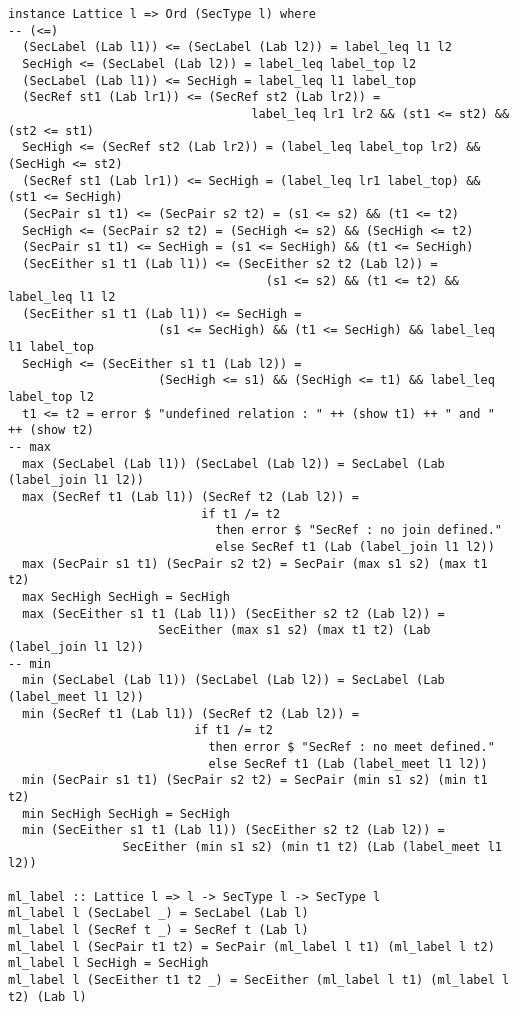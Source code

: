 \begin{Verbatim}[fontsize=\footnotesize,frame=lines,
                 framesep=5mm, label={[Lattice.hs]Lattice.hs}]
instance Lattice l => Ord (SecType l) where
-- (<=)
  (SecLabel (Lab l1)) <= (SecLabel (Lab l2)) = label_leq l1 l2
  SecHigh <= (SecLabel (Lab l2)) = label_leq label_top l2
  (SecLabel (Lab l1)) <= SecHigh = label_leq l1 label_top
  (SecRef st1 (Lab lr1)) <= (SecRef st2 (Lab lr2)) = 
                                  label_leq lr1 lr2 && (st1 <= st2) && (st2 <= st1)
  SecHigh <= (SecRef st2 (Lab lr2)) = (label_leq label_top lr2) && (SecHigh <= st2)
  (SecRef st1 (Lab lr1)) <= SecHigh = (label_leq lr1 label_top) && (st1 <= SecHigh)
  (SecPair s1 t1) <= (SecPair s2 t2) = (s1 <= s2) && (t1 <= t2)
  SecHigh <= (SecPair s2 t2) = (SecHigh <= s2) && (SecHigh <= t2)
  (SecPair s1 t1) <= SecHigh = (s1 <= SecHigh) && (t1 <= SecHigh)
  (SecEither s1 t1 (Lab l1)) <= (SecEither s2 t2 (Lab l2)) = 
                                    (s1 <= s2) && (t1 <= t2) && label_leq l1 l2
  (SecEither s1 t1 (Lab l1)) <= SecHigh = 
                     (s1 <= SecHigh) && (t1 <= SecHigh) && label_leq l1 label_top
  SecHigh <= (SecEither s1 t1 (Lab l2)) = 
                     (SecHigh <= s1) && (SecHigh <= t1) && label_leq label_top l2
  t1 <= t2 = error $ "undefined relation : " ++ (show t1) ++ " and " ++ (show t2) 
-- max
  max (SecLabel (Lab l1)) (SecLabel (Lab l2)) = SecLabel (Lab (label_join l1 l2))
  max (SecRef t1 (Lab l1)) (SecRef t2 (Lab l2)) = 
                           if t1 /= t2
                             then error $ "SecRef : no join defined."
                             else SecRef t1 (Lab (label_join l1 l2))
  max (SecPair s1 t1) (SecPair s2 t2) = SecPair (max s1 s2) (max t1 t2)
  max SecHigh SecHigh = SecHigh
  max (SecEither s1 t1 (Lab l1)) (SecEither s2 t2 (Lab l2)) = 
                     SecEither (max s1 s2) (max t1 t2) (Lab (label_join l1 l2))
-- min
  min (SecLabel (Lab l1)) (SecLabel (Lab l2)) = SecLabel (Lab (label_meet l1 l2))
  min (SecRef t1 (Lab l1)) (SecRef t2 (Lab l2)) = 
                          if t1 /= t2
                            then error $ "SecRef : no meet defined."
                            else SecRef t1 (Lab (label_meet l1 l2))
  min (SecPair s1 t1) (SecPair s2 t2) = SecPair (min s1 s2) (min t1 t2)
  min SecHigh SecHigh = SecHigh
  min (SecEither s1 t1 (Lab l1)) (SecEither s2 t2 (Lab l2)) =
                SecEither (min s1 s2) (min t1 t2) (Lab (label_meet l1 l2))

ml_label :: Lattice l => l -> SecType l -> SecType l
ml_label l (SecLabel _) = SecLabel (Lab l)
ml_label l (SecRef t _) = SecRef t (Lab l)
ml_label l (SecPair t1 t2) = SecPair (ml_label l t1) (ml_label l t2)
ml_label l SecHigh = SecHigh
ml_label l (SecEither t1 t2 _) = SecEither (ml_label l t1) (ml_label l t2) (Lab l)


\end{Verbatim}
